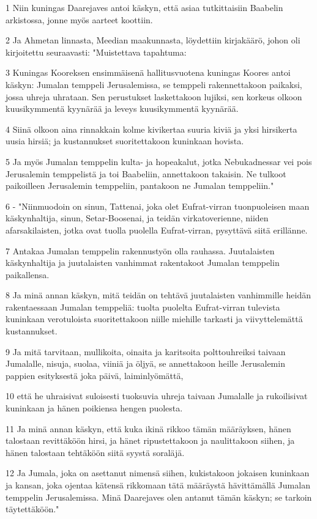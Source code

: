 \par 1 Niin kuningas Daarejaves antoi käskyn, että asiaa tutkittaisiin Baabelin arkistossa, jonne myös aarteet koottiin.
\par 2 Ja Ahmetan linnasta, Meedian maakunnasta, löydettiin kirjakäärö, johon oli kirjoitettu seuraavasti: "Muistettava tapahtuma:
\par 3 Kuningas Kooreksen ensimmäisenä hallitusvuotena kuningas Koores antoi käskyn: Jumalan temppeli Jerusalemissa, se temppeli rakennettakoon paikaksi, jossa uhreja uhrataan. Sen perustukset laskettakoon lujiksi, sen korkeus olkoon kuusikymmentä kyynärää ja leveys kuusikymmentä kyynärää.
\par 4 Siinä olkoon aina rinnakkain kolme kivikertaa suuria kiviä ja yksi hirsikerta uusia hirsiä; ja kustannukset suoritettakoon kuninkaan hovista.
\par 5 Ja myös Jumalan temppelin kulta- ja hopeakalut, jotka Nebukadnessar vei pois Jerusalemin temppelistä ja toi Baabeliin, annettakoon takaisin. Ne tulkoot paikoilleen Jerusalemin temppeliin, pantakoon ne Jumalan temppeliin."
\par 6 - "Niinmuodoin on sinun, Tattenai, joka olet Eufrat-virran tuonpuoleisen maan käskynhaltija, sinun, Setar-Boosenai, ja teidän virkatoverienne, niiden afarsakilaisten, jotka ovat tuolla puolella Eufrat-virran, pysyttävä siitä erillänne.
\par 7 Antakaa Jumalan temppelin rakennustyön olla rauhassa. Juutalaisten käskynhaltija ja juutalaisten vanhimmat rakentakoot Jumalan temppelin paikallensa.
\par 8 Ja minä annan käskyn, mitä teidän on tehtävä juutalaisten vanhimmille heidän rakentaessaan Jumalan temppeliä: tuolta puolelta Eufrat-virran tulevista kuninkaan verotuloista suoritettakoon niille miehille tarkasti ja viivyttelemättä kustannukset.
\par 9 Ja mitä tarvitaan, mullikoita, oinaita ja karitsoita polttouhreiksi taivaan Jumalalle, nisuja, suolaa, viiniä ja öljyä, se annettakoon heille Jerusalemin pappien esityksestä joka päivä, laiminlyömättä,
\par 10 että he uhraisivat suloisesti tuoksuvia uhreja taivaan Jumalalle ja rukoilisivat kuninkaan ja hänen poikiensa hengen puolesta.
\par 11 Ja minä annan käskyn, että kuka ikinä rikkoo tämän määräyksen, hänen talostaan revittäköön hirsi, ja hänet ripustettakoon ja naulittakoon siihen, ja hänen talostaan tehtäköön siitä syystä soraläjä.
\par 12 Ja Jumala, joka on asettanut nimensä siihen, kukistakoon jokaisen kuninkaan ja kansan, joka ojentaa kätensä rikkomaan tätä määräystä hävittämällä Jumalan temppelin Jerusalemissa. Minä Daarejaves olen antanut tämän käskyn; se tarkoin täytettäköön."

